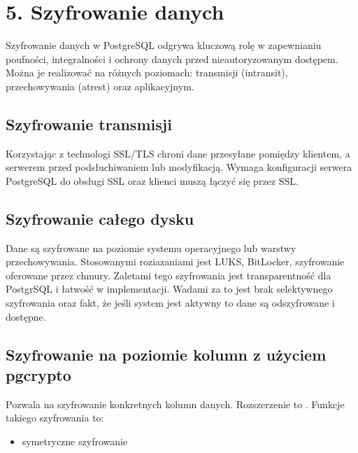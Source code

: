 \documentclass[a4paper,11pt,polish]{sphinxmanual}
\begin{document}
\begin{sphinxVerbatim}[commandchars=\\\{\}]
      
\end{sphinxVerbatim}


\section{5. Szyfrowanie danych}
\label{\detokenize{Bezpieczenstwo/index:szyfrowanie-danych}}
\sphinxAtStartPar
Szyfrowanie danych w PostgreSQL odgrywa kluczową rolę w zapewnianiu poufności, integralności i ochrony danych przed nieautoryzowanym dostępem. Można je realizować na różnych poziomach: transmisji (in\sphinxhyphen{}transit), przechowywania (at\sphinxhyphen{}rest) oraz aplikacyjnym.


\subsection{Szyfrowanie transmisji}
\label{\detokenize{Bezpieczenstwo/index:szyfrowanie-transmisji}}
\sphinxAtStartPar
Korzystając z technologi SSL/TLS chroni dane przesyłane pomiędzy klientem, a serwerem przed podsłuchiwaniem lub modyfikacją. Wymaga konfiguracji serwera PostgreSQL do obsługi SSL oraz klienci muszą łączyć się przez SSL.


\subsection{Szyfrowanie całego dysku}
\label{\detokenize{Bezpieczenstwo/index:szyfrowanie-calego-dysku}}
\sphinxAtStartPar
Dane są szyfrowane na poziomie systemu operacyjnego lub warstwy przechowywania. Stosowanymi roziazaniami jest LUKS, BitLocker, szyfrowanie oferowane przez chmury. Zaletami tego szyfrowania jest transparentność dla PostgrSQL i łatwość w implementacji. Wadami za to jest brak selektywnego szyfrowania oraz fakt, że jeśli system jest aktywny to dane są odszyfrowane i dostępne.


\subsection{Szyfrowanie na poziomie kolumn z użyciem pgcrypto}
\label{\detokenize{Bezpieczenstwo/index:szyfrowanie-na-poziomie-kolumn-z-uzyciem-pgcrypto}}
\sphinxAtStartPar
Pozwala na szyfrowanie konkretnych kolumn danych. Rozszerzenie to . Funkcje takiego szyfrowania to:
\begin{itemize}
\item {} 
\sphinxAtStartPar
symetryczne szyfrowanie

\end{itemize}
\end{document}
